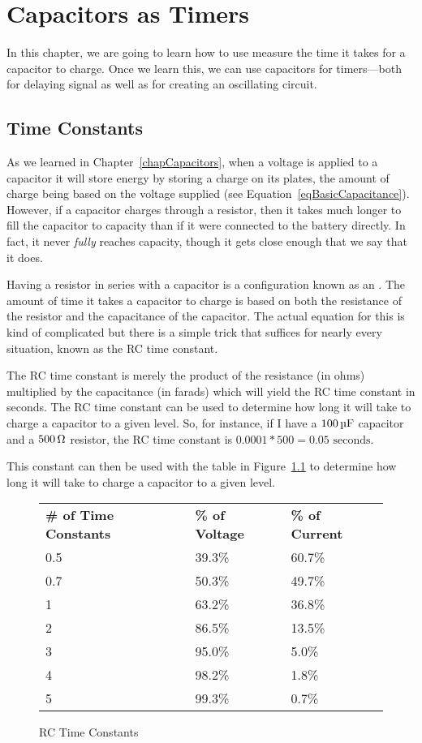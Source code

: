 \chapter{Capacitors as Timers}
\label{chapCapacitorTimer}

In this chapter, we are going to learn how to use measure the time it takes for a capacitor to charge.  
Once we learn this, we can use capacitors for timers---both for delaying signal as well as for creating an oscillating circuit.

\section{Time Constants}

As we learned in Chapter~\ref{chapCapacitors}, when a voltage is applied to a capacitor it will store energy by storing a charge on its plates, the amount of charge being based on the voltage supplied (see Equation~\ref{eqBasicCapacitance}).
However, if a capacitor charges through a resistor, then it takes much longer to fill the capacitor to capacity than if it were connected to the battery directly.
In fact, it never \emph{fully} reaches capacity, though it gets close enough that we say that it does.

Having a resistor in series with a capacitor is a configuration known as an .
The amount of time it takes a capacitor to charge is based on both the resistance of the resistor and the capacitance of the capacitor.
The actual equation for this is kind of complicated but there is a simple trick that suffices for nearly every situation, known as the RC time constant.

The RC time constant is merely the product of the resistance (in ohms) multiplied by the capacitance (in farads) which will yield the RC time constant in seconds.
The RC time constant can be used to determine how long it will take to charge a capacitor to a given level.
So, for instance, if I have a $100\,\si{\micro\farad}$ capacitor and a $500\,\si{\ohm}$ resistor, the RC time constant is $0.0001 * 500 = 0.05\textrm{ seconds}$.

This constant can then be used with the table in Figure~\ref{figTimeConstants} to determine how long it will take to charge a capacitor to a given level.

\begin{figure}
\caption{RC Time Constants}
\label{figTimeConstants}
\begin{tabular}{|l|l|l}
\textbf{\# of Time Constants} & \textbf{\% of Voltage} & \textbf{\% of Current} \\
0.5 & 39.3\% & 60.7\% \\
0.7 & 50.3\% & 49.7\% \\
1 & 63.2\% & 36.8\% \\
2 & 86.5\% & 13.5\% \\
3 & 95.0\% & 5.0\% \\
4 & 98.2\% & 1.8\% \\
5 & 99.3\% & 0.7\% \\
\end{tabular}
\end{figure}

